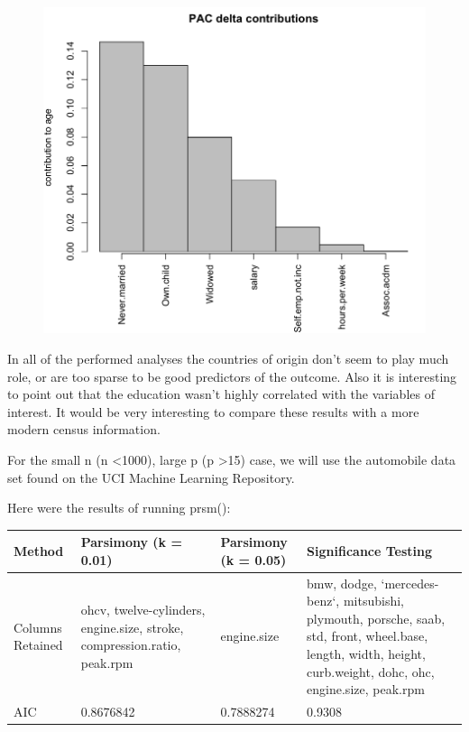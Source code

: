 \documentclass[letter]{article}
\begin{document}
\begin{figure}
\includegraphics[scale=0.5]{figures/ageContrib.png}
\caption{}
 \label{fig:ageContrib}
\end{figure}

In all of the performed analyses the countries of origin don't seem to play much role, or are too sparse to be good predictors of the outcome. Also it is interesting to point out that the education wasn't highly correlated with the variables of interest. It would be very interesting to compare these results with a more modern census information.



For the small n (n \textless 1000), large p (p \textgreater 15) case, we will use the automobile data set found on the UCI Machine Learning Repository.

Here were the results of running prsm(): \\

\begin{center}
    \begin{tabular}{ | l |  p{4cm} |  p{4cm} | p{4cm} |}
    \hline
    Method & Parsimony (k = 0.01) & Parsimony (k = 0.05) & Significance Testing \\ \hline
    
    Columns Retained & ohcv, twelve-cylinders, engine.size, stroke, compression.ratio, peak.rpm & engine.size & bmw, dodge, `mercedes-benz`, mitsubishi, plymouth, porsche, saab, std, front, wheel.base, length, width, height, curb.weight, dohc, ohc, engine.size, peak.rpm\\ \hline
    
    AIC & 0.8676842 & 0.7888274 & 0.9308\\ \hline
    
    \end{tabular}
\end{center}
\end{document}
